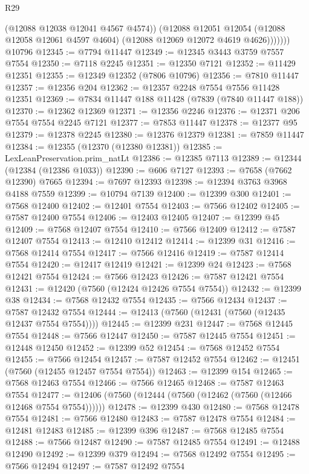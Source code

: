 \begin{lexlean}{R29}
\begin{coremodule}
                (@12088 @12038 @12041 @4567 @4574))
              (@12088
                @12051
                @12054
                (@12088 @12058 @12061 @4597 @4604)
                (@12088 @12069 @12072 @4619 @4626)))))))
    @10796
@12345 := @7794 @11447
@12349 := @12345 @3443 @3759 @7557 @7554
@12350 := @7118 @2245
@12351 := @12350 @7121
@12352 := @11429 @12351
@12355 := @12349 @12352 (@7806 @10796)
@12356 := @7810 @11447
@12357 := @12356 @204
@12362 := @12357 @2248 @7554 @7556 @11428 @12351
@12369 := @7834 @11447 @188 @11428 (@7839 (@7840 @11447 @188))
@12370 := @12362 @12369
@12371 := @12356 @2246
@12376 := @12371 @206 @7554 @7554 @2245 @7121
@12377 := @7853 @11447
@12378 := @12377 @95
@12379 := @12378 @2245
@12380 := @12376 @12379
@12381 := @7859 @11447
@12384 := @12355 (@12370 (@12380 @12381))
@12385 := LexLeanPreservation.prim_natLt
@12386 := @12385 @7113
@12389 := @12344 (@12384 (@12386 @1033))
@12390 := @606 @7127
@12393 := @7658 (@7662 @12390) @7665
@12394 := @7697 @12393
@12398 := @12394 @3763 @3968 @4188 @7559
@12399 := @10794 @7139
@12400 := @12399 @300
@12401 := @7568 @12400
@12402 := @12401 @7554
@12403 := @7566 @12402
@12405 := @7587 @12400 @7554
@12406 := @12403 @12405
@12407 := @12399 @45
@12409 := @7568 @12407 @7554
@12410 := @7566 @12409
@12412 := @7587 @12407 @7554
@12413 := @12410 @12412
@12414 := @12399 @31
@12416 := @7568 @12414 @7554
@12417 := @7566 @12416
@12419 := @7587 @12414 @7554
@12420 := @12417 @12419
@12421 := @12399 @24
@12423 := @7568 @12421 @7554
@12424 := @7566 @12423
@12426 := @7587 @12421 @7554
@12431 := @12420 (@7560 (@12424 @12426 @7554 @7554))
@12432 := @12399 @38
@12434 := @7568 @12432 @7554
@12435 := @7566 @12434
@12437 := @7587 @12432 @7554
@12444 := @12413 (@7560 (@12431 (@7560 (@12435 @12437 @7554 @7554))))
@12445 := @12399 @231
@12447 := @7568 @12445 @7554
@12448 := @7566 @12447
@12450 := @7587 @12445 @7554
@12451 := @12448 @12450
@12452 := @12399 @52
@12454 := @7568 @12452 @7554
@12455 := @7566 @12454
@12457 := @7587 @12452 @7554
@12462 := @12451 (@7560 (@12455 @12457 @7554 @7554))
@12463 := @12399 @154
@12465 := @7568 @12463 @7554
@12466 := @7566 @12465
@12468 := @7587 @12463 @7554
@12477 := @12406 (@7560 (@12444 (@7560 (@12462 (@7560 (@12466 @12468 @7554 @7554))))))
@12478 := @12399 @430
@12480 := @7568 @12478 @7554
@12481 := @7566 @12480
@12483 := @7587 @12478 @7554
@12484 := @12481 @12483
@12485 := @12399 @396
@12487 := @7568 @12485 @7554
@12488 := @7566 @12487
@12490 := @7587 @12485 @7554
@12491 := @12488 @12490
@12492 := @12399 @379
@12494 := @7568 @12492 @7554
@12495 := @7566 @12494
@12497 := @7587 @12492 @7554

\end{coremodule}
\end{lexlean}
